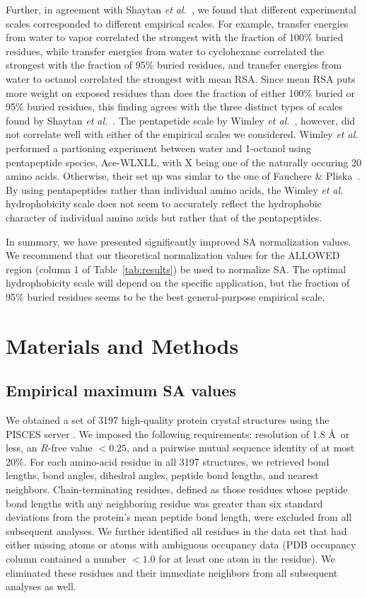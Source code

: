 \documentclass[11pt]{article}
\begin{document}
Further, in agreement with Shaytan \emph{et al.}~\cite{Shaytan2009}, we found that different experimental scales corresponded to different empirical scales. For example, transfer energies from water to vapor correlated the strongest with the fraction of 100\% buried residues, while transfer energies from water to cyclohexane correlated the strongest with the fraction of 95\% buried residues, and transfer energies from water to octanol correlated the strongest with mean RSA. Since mean RSA puts more weight on exposed residues than does the fraction of either 100\% buried or 95\% buried residues, this finding agrees with the three distinct types of scales found by Shaytan \emph{et al.}~\cite{Shaytan2009}. The pentapetide scale by Wimley \emph{et al.}~\cite{Wimley1996}, however, did not correlate well with either of the empirical scales we considered. Wimley \emph{et al.} performed a partioning experiment between water and 1-octanol using pentapeptide species, Ace-WLXLL, with X being one of the naturally occuring 20 amino acids. Otherwise, their set up was simlar to the one of Fauchere \& Pliska~\cite{Fauchere1983}. By using pentapeptides rather than individual amino acids, the Wimley \emph{et al.} hydrophobicity scale does not seem to accurately reflect the hydrophobic character of individual amino acids but rather that of the pentapeptides.

In summary, we have presented significantly improved SA normalization values. We recommend that our theoretical normalization values for the ALLOWED region (column 1 of Table~\ref{tab:results}) be used to normalize SA. The optimal hydrophobicity scale will depend on the specific application, but the fraction of 95\% buried residues seems to be the best general-purpose empirical scale.


\section*{Materials and Methods}

\subsection*{Empirical maximum SA values}

We obtained a set of 3197 high-quality protein crystal structures using the PISCES server \cite{WangDunbrack2003}. We imposed the following requirements: resolution of 1.8 \AA\ or less, an $R$-free value $<0.25$, and a pairwise mutual sequence identity of at most 20\%. For each amino-acid residue in all 3197 structures, we retrieved bond lengths, bond angles, dihedral angles, peptide bond lengths, and nearest neighbors. Chain-terminating residues, defined as those residues whose peptide bond lengths with any neighboring residue was greater than six standard deviations from the protein's mean peptide bond length, were excluded from all subsequent analyses. We further identified all residues in the data set that had either missing atoms or atoms with ambiguous occupancy data (PDB occupancy column contained a number $<1.0$ for at least one atom in the residue). We eliminated these residues and their immediate neighbors from all subsequent analyses as well.
\end{document}
